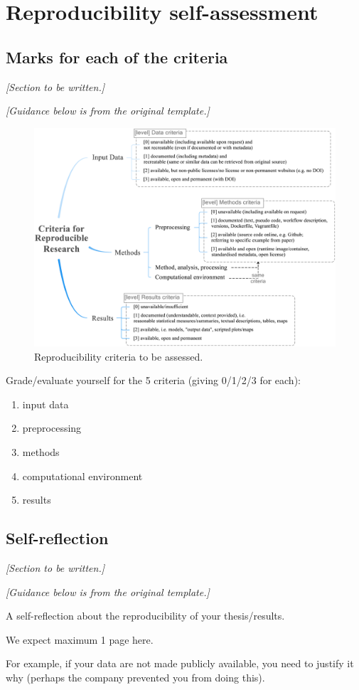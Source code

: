 
\chapter{Reproducibility self-assessment}

\section{Marks for each of the criteria}

\textit{[Section to be written.]}

\textit{[Guidance below is from the original template.]}

\begin{figure}[h]
  \centering
  \includegraphics[width=0.8\linewidth]{figs/reproducibility_criteria.png}
  \caption{Reproducibility criteria to be assessed.}
\label{fig:reproducibility_criteria}
\end{figure}

Grade/evaluate yourself for the 5 criteria (giving 0/1/2/3 for each):
\begin{enumerate}
  \item input data
  \item preprocessing
  \item methods
  \item computational environment
  \item results
\end{enumerate}


\section{Self-reflection} 

\textit{[Section to be written.]}

\textit{[Guidance below is from the original template.]}

A self-reflection about the reproducibility of your thesis/results.

We expect maximum 1 page here.

For example, if your data are not made publicly available, you need to justify it why (perhaps the company prevented you from doing this).